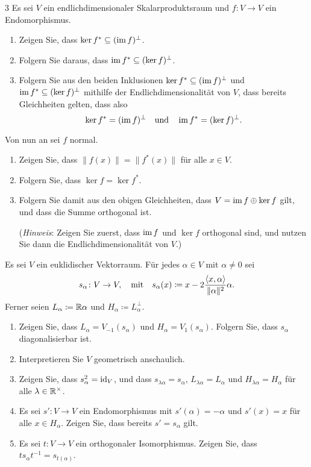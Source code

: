 \begin{question}[subtitle = Bilder und Kerne adjungierter und normaler Endomorphismen]{3}
  Es sei $V$ ein endlichdimensionaler Skalarproduktsraum und $f \colon V \to V$ ein Endomorphismus.
  \begin{enumerate}[leftmargin=*]
    \item
      Zeigen Sie, dass $\ker f^* \subseteq (\operatorname{im} f)^\perp$.
    \item
      Folgern Sie daraus, dass $\operatorname{im} f^* \subseteq (\ker f)^\perp$.
    \item
      Folgern Sie aus den beiden Inklusionen $\ker f^* \subseteq (\operatorname{im} f)^\perp$ und $\operatorname{im} f^* \subseteq (\ker f)^\perp$ mithilfe der Endlichdimensionalität von $V$, dass bereits Gleichheiten gelten, dass also
      \[
        \ker f^* = (\operatorname{im} f)^\perp
        \quad\text{und}\quad
        \operatorname{im} f^* = (\ker f)^\perp.
      \]
  \end{enumerate}
  Von nun an sei $f$ normal.
  \begin{enumerate}[leftmargin=*, resume]
    \item
      Zeigen Sie, dass $\|f(x)\| = \|f^*(x)\|$ für alle $x \in V$.
    \item
      Folgern Sie, dass $\ker f = \ker f^*$.
    \item
      Folgern Sie damit aus den obigen Gleichheiten, dass $V = \operatorname{im} f \oplus \ker f$ gilt, und dass die Summe orthogonal ist.
      
      (\emph{Hinweis}:
       Zeigen Sie zuerst, dass $\operatorname{im} f$ und $\ker f$ orthogonal sind, und nutzen Sie dann die Endlichdimensionalität von $V$.)
  \end{enumerate}
\end{question}


\begin{question}[subtitle = Spiegelungen]{3}
  Es sei $V$ ein euklidischer Vektorraum.
  Für jedes $\alpha \in V$ mit $\alpha \neq 0$ sei
  \[
    s_\alpha \colon V \to V,
    \quad\text{mit}\quad
              s_\alpha(x)
    \coloneqq x - 2 \frac{\left\langle x, \alpha \right\rangle}{\|\alpha\|^2} \alpha.
  \]
  Ferner seien $L_\alpha \coloneqq \mathbb{R} \alpha$ und $H_\alpha \coloneqq L_\alpha^\perp$.
  \begin{enumerate}[leftmargin=*]
    \item
      Zeigen Sie, dass $L_\alpha = V_{-1}(s_\alpha)$ und $H_\alpha = V_1(s_\alpha)$.
      Folgern Sie, dass $s_\alpha$ diagonalisierbar ist.
    \item
      Interpretieren Sie $V$ geometrisch anschaulich.
    \item
      Zeigen Sie, dass $s_\alpha^2 = \operatorname{id}_V$, und dass $s_{\lambda \alpha} = s_\alpha$, $L_{\lambda \alpha} = L_\alpha$ und $H_{\lambda \alpha} = H_\alpha$ für alle $\lambda \in \mathbb{R}^\times$.
    \item
      Es sei $s' \colon V \to V$ ein Endomorphismus mit $s'(\alpha) = -\alpha$ und $s'(x) = x$ für alle $x \in H_\alpha$.
      Zeigen Sie, dass bereits $s' = s_\alpha$ gilt.
    \item
      Es sei $t \colon V \to V$ ein orthogonaler Isomorphismus. Zeigen Sie, dass $t s_\alpha t^{-1} = s_{t(\alpha)}$.
  \end{enumerate}
\end{question}


